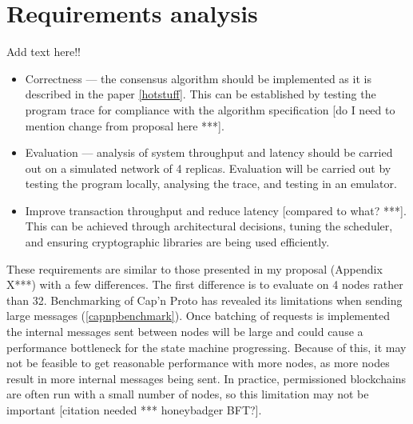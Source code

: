 \section{Requirements analysis}
Add text here!!

\begin{itemize}
	\item Correctness --- the consensus algorithm should be implemented as it is described in the paper \ref{hotstuff}. This can be established by testing the program trace for compliance with the algorithm specification [do I need to mention change from proposal here ***].
	\item Evaluation --- analysis of system throughput and latency should be carried out on a simulated network of 4 replicas. Evaluation will be carried out by testing the program locally, analysing the trace, and testing in an emulator.
	\item Improve transaction throughput and reduce latency [compared to what? ***]. This can be achieved through architectural decisions, tuning the scheduler, and ensuring cryptographic libraries are being used efficiently.
\end{itemize}

These requirements are similar to those presented in my proposal (Appendix X***) with a few differences. The first difference is to evaluate on 4 nodes rather than 32. Benchmarking of Cap'n Proto has revealed its limitations when sending large messages (\ref{capnpbenchmark}). Once batching of requests is implemented the internal messages sent between nodes will be large and could cause a performance bottleneck for the state machine progressing. Because of this, it may not be feasible to get reasonable performance with more nodes, as more nodes result in more internal messages being sent. In practice, permissioned blockchains are often run with a small number of nodes, so this limitation may not be important [citation needed *** honeybadger BFT?].


